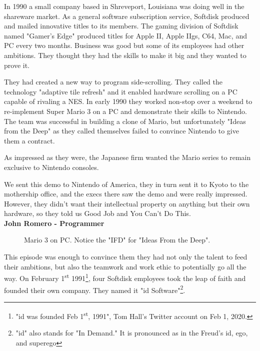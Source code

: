 \documentclass[book.tex]{subfiles}
\begin{document}
\label{chapter_team}
In 1990 a small company based in Shreveport, Louisiana was doing well in the shareware market. As a general software subscription service, Softdisk produced and mailed innovative titles to its members. The gaming division of Softdisk named "Gamer's Edge" produced titles for Apple II, Apple IIgs, C64, Mac, and PC every two months. Business was good but some of its employees had other ambitions. They thought they had the skills to make it big and they wanted to prove it.\\
\par
They had created a new way to program side-scrolling. They called the technology "adaptive tile refresh" and it enabled hardware scrolling on a PC capable of rivaling a NES. In early 1990 they worked non-stop over a weekend to re-implement Super Mario 3 on a PC and demonstrate their skills to Nintendo. The team was successful in building a clone of Mario, but unfortunately "Ideas from the Deep" as they called themselves failed to convince Nintendo to give them a contract.\\
\par As impressed as they were, the Japanese firm wanted the Mario series to remain exclusive to Nintendo consoles.\\
\par
\begin{fancyquotes}
We sent this demo to Nintendo of America, they in turn sent it to Kyoto to the mothership office, and the execs there saw the demo and were really impressed. However, they didn't want their intellectual property on anything but their own hardware, so they told us Good Job and You Can't Do This\protect\footnotemark.
 \bigskip \\
\textbf{John Romero - Programmer}
 \end{fancyquotes}
 \begin{figure}[H]
\caption{Mario 3 on PC. Notice the "IFD" for "Ideas From the Deep".}
\end{figure}

\par
This episode was enough to convince them they had not only the talent to feed their ambitions, but also the teamwork and work ethic to potentially go all the way. On February 1\textsuperscript{st} 1991\footnote{"id was founded Feb 1\textsuperscript{st}, 1991", Tom Hall's Twitter account on Feb 1, 2020.}, four Softdisk employees took the leap of faith and founded their own company. They named it "id Software"\footnote{"id" also stands for "In Demand." It is pronounced as in the Freud's id, ego, and superego}.\\ 
\par
 
\end{document}
